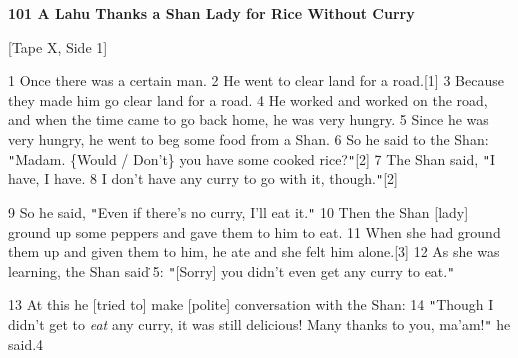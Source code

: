 
\textbf{101 A Lahu Thanks a Shan Lady for Rice Without Curry }

[Tape X, Side 1]

1 Once there was a certain man. 2 He went to clear land for a road.[1] 3 Because
they made him go clear land for a road. 4 He worked and worked on the road, and
when the time came to go back home, he was very hungry. 5 Since he was very hungry,
he went to beg some food from a Shan. 6 So he said to the Shan: \texttt{"}Madam.
\{Would / Don't\} you have some cooked rice?\texttt{"}[2] 7 The Shan said, \texttt{"}I
have, I have. 8 I don't have any curry to go with it, though.\texttt{"}[2]

9 So he said, \texttt{"}Even if there's no curry, I'll eat it.\texttt{"} 10 Then
the Shan [lady] ground up some peppers and gave them to him to eat. 11 When she
had ground them up and given them to him, he ate and she felt him alone.[3] 12
As she was learning, the Shan said\.5: \texttt{"}[Sorry] you didn't even get any
curry to eat.\texttt{"}

13 At this he [tried to] make [polite] conversation with the Shan: 14 \texttt{"}Though
I didn't get to \textit{eat} any curry, it was still delicious! Many thanks to
you, ma'am!\texttt{"} he said.4


